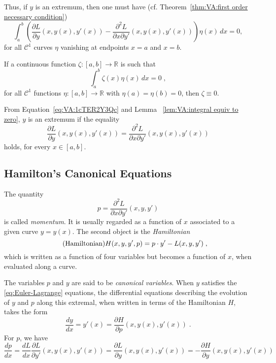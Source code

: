 Thus, if $y$ is an extremum, then one must have (cf. 
Theorem~\ref{thm:VA:first order necessary condition})
\begin{equation}\label{eq:VA:1cTER2Y3Qc}
	\int_a^b\left(\dfrac{\partial L}{\partial y}(x,
	y(x),y'(x))-\dfrac{\partial^2 L}{\partial x\partial y'}(x,
	y(x),y'(x))\right)\eta(x)\,dx=0,
\end{equation}
for all $\mathcal{C}^1$ curves $\eta$ vanishing at endpoints $x=a$ and 
$x=b$.

\begin{lemma}\label{lem:VA:integral equiv to zero}
	If a continuous function $\zeta:[a,b]\to\mathbb{R}$ is such that
	\[\int_a^b \zeta(x)\eta(x)\,dx=0\;,\]
	for all $\mathcal{C}^1$ functions $\eta:[a,b]\to\mathbb{R}$ with 
	$\eta(a)=\eta(b)=0$, then $\zeta\equiv0$.
\end{lemma}

From Equation~\eqref{eq:VA:1cTER2Y3Qc} and Lemma~
\eqref{lem:VA:integral equiv to zero}, $y$ is an extremum if the equality
\begin{equation}\tag{Euler-Lagrange}\label{eq:Euler-Lagrange}
	\dfrac{\partial L}{\partial y}(x,
	y(x),y'(x))=\dfrac{\partial^2 L}{\partial x\partial y'}(x,
	y(x),y'(x))
\end{equation}
holds, for every $x\in[a,b]$.

\subsection{Hamilton's Canonical Equations}

The quantity
\begin{equation}\label{eq:VA:momentum}\tag{momentum}
	p=\dfrac{\partial^2L}{\partial x\partial y'}(x,y,y')
\end{equation}
is called \emph{momentum}. It is usually regarded as a function of $x$
associated to a given curve $y=y(x)$. The second object is the 
\emph{Hamiltonian}
\begin{equation}\label{eq:VA:Hamiltonian}\tag{Hamiltonian}\index{Hamiltonian}
	H(x,y,y',p)=p\cdot y' - L(x,y,y')\;,
\end{equation}
which is written as a function of four variables but becomes a function
of $x$, when evaluated along a curve.

The variables $p$ and $y$ are said to be \emph{canonical variables}. When $y$ satisfies the 
\eqref{eq:Euler-Lagrange} equations, the differential equations
describing the evolution of $y$ and $p$ along this extremal, when written
in terms of the Hamiltonian $H$, takes the form
\[
	\dfrac{dy}{dx}=y'(x)=\dfrac{\partial H}{\partial p}(x, y(x), y'(x))\;.
\]
For $p$, we have
\[
	\dfrac{dp}{dx}=\dfrac{dL}{dx}\dfrac{\partial L}{\partial y'}(x, y(x), y'(x))
	= \dfrac{\partial L}{\partial y}(x, y(x), y'(x))
	=-\dfrac{\partial H}{\partial y}(x, y(x), y'(x))
\]

